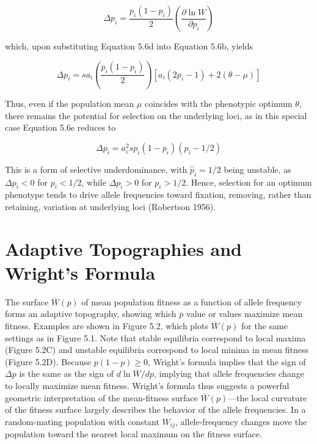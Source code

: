 \documentclass{article}
\begin{document}
\begin{equation}
\Delta p_{i}=\frac{p_{i}(1-p_{i})}{2}\left(\frac{\partial\ln W}{\partial p_{i}}\right)
\end{equation}

which, upon substituting Equation 5.6d into Equation 5.6b, yields

\begin{equation}
\Delta p_{i}=s a_{i}\left(\frac{p_{i}(1-p_{i})}{2}\right)\left[a_{i}\left(2p_{i}-1\right)+2(\theta-\mu)\right]
\tag{5.6e}
\label{eq:5_6e}
\end{equation}

Thus, even if the population mean  $ \mu $ coincides with the phenotypic optimum  $ \theta $, there remains the potential for selection on the underlying loci, as in this special case Equation 5.6e reduces to

\begin{equation}
\Delta p_{i}=a_{i}^{2}s p_{i}(1-p_{i})(p_{i}-1/2)
\tag{5.6f}
\label{eq:5_6f}
\end{equation}

This is a form of selective underdominance, with  $ \widehat{p}_i = 1/2 $ being unstable, as  $ \Delta p_i < 0 $ for  $ p_i < 1/2 $, while  $ \Delta p_i > 0 $ for  $ p_i > 1/2 $. Hence, selection for an optimum phenotype tends to drive allele frequencies toward fixation, removing, rather than retaining, variation at underlying loci (Robertson 1956).

\section{Adaptive Topographies and Wright's Formula}
The surface  $ \overline{W}(p) $ of mean population fitness as a function of allele frequency forms an adaptive topography, showing which  $ \overline{p} $ value or values maximize mean fitness. Examples are shown in Figure 5.2, which plots  $ \overline{W}(p) $ for the same settings as in Figure 5.1. Note that stable equilibria correspond to local maxima (Figure 5.2C) and unstable equilibria correspond to local minima in mean fitness (Figure 5.2D). Because  $ p(1 - p) \geq 0 $, Wright's formula implies that the sign of  $ \Delta p $ is the same as the sign of  $ d \ln \overline{W}/dp $, implying that allele frequencies change to locally maximize mean fitness. Wright's formula thus suggests a powerful geometric interpretation of the mean-fitness surface  $ \overline{W}(p) $—the local curvature of the fitness surface largely describes the behavior of the allele frequencies. In a random-mating population with constant  $ W_{ij} $, allele-frequency changes move the population toward the nearest local maximum on the fitness surface.
\end{document}
